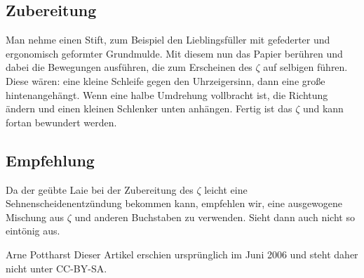 {    \subsection*{Zubereitung}
    Man nehme einen Stift, zum Beispiel den Lieblingsfüller
    mit gefederter und ergonomisch geformter Grundmulde.
    Mit diesem nun das Papier berühren und dabei die Bewegungen
    ausführen, die zum Erscheinen des $\zeta$ auf selbigen
    führen. Diese wären: eine kleine Schleife gegen den Uhrzeigersinn,
    dann eine große hintenangehängt. Wenn eine halbe
    Umdrehung vollbracht ist, die Richtung ändern und einen kleinen Schlenker
    unten anhängen. Fertig ist das $\zeta$ und kann fortan bewundert werden.

    \subsection*{Empfehlung}
    Da der geübte Laie bei der Zubereitung des $\zeta$ leicht eine
    Sehnenscheidenentzündung bekommen kann, empfehlen wir, eine ausgewogene
    Mischung aus $\zeta$ und anderen Buchstaben zu verwenden. Sieht dann auch nicht so
    eintönig aus.}
{Arne Pottharst}\vfill
\small Dieser Artikel erschien ursprünglich im Juni 2006 und steht daher nicht unter
CC-BY-SA.
